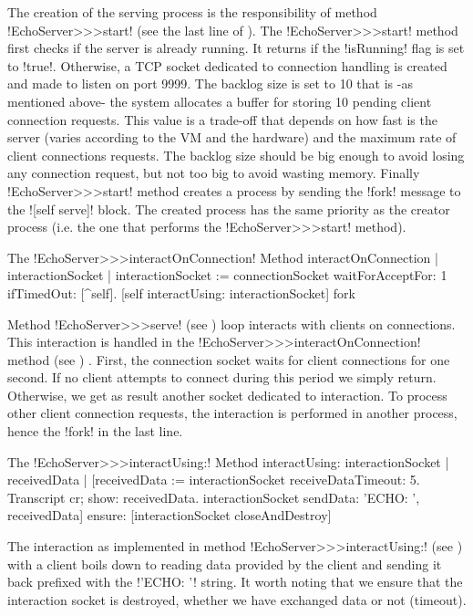 \documentclass[a4paper,10pt,twoside]{book}
\begin{document}
The creation of the serving process is the responsibility of method \ct!EchoServer>>>start! (see the last line of ).
The \ct!EchoServer>>>start! method first checks if the server is already running.
It returns if the \ct!isRunning! flag is set to \ct!true!.
Otherwise, a TCP socket dedicated to connection handling is created and made to listen on port 9999.
The backlog size is set to 10 that is -as mentioned above- the system allocates a buffer for storing 10 pending client connection requests.
This value is a trade-off that depends on how fast is the server (varies according to the VM and the hardware) and the maximum rate of client connections requests.
The backlog size should be big enough to avoid losing any connection request, but not too big to avoid wasting memory.
Finally \ct!EchoServer>>>start! method creates a process by sending the \ct!fork! message to the \ct![self serve]! block.
The created process has the same priority as the creator process (i.e. the one that performs the \ct!EchoServer>>>start! method).


\begin{method}{The \ct!EchoServer>>>interactOnConnection! Method}
interactOnConnection
	| interactionSocket |
	interactionSocket := connectionSocket waitForAcceptFor: 1 ifTimedOut: [^self].
	[self interactUsing: interactionSocket] fork
\end{method}

Method \ct!EchoServer>>>serve! (see ) loop interacts with clients on connections.
This interaction is handled in the \ct!EchoServer>>>interactOnConnection! method (see ) .
First, the connection socket waits for client connections for one second.
If no client attempts to connect during this period we simply return.
Otherwise, we get as result another socket dedicated to interaction.
To process other client connection requests, the interaction is performed in another process, hence the \ct!fork! in the last line.

\begin{method}{The \ct!EchoServer>>>interactUsing:! Method}
interactUsing: interactionSocket
	| receivedData |
	[receivedData := interactionSocket receiveDataTimeout: 5.
	 Transcript cr; show: receivedData.
	 interactionSocket sendData: 'ECHO: ', receivedData]
		ensure: [interactionSocket closeAndDestroy]
\end{method}
The interaction as implemented in method \ct!EchoServer>>>interactUsing:! (see ) with a client boils down to reading data provided by the client and sending it back prefixed with the \ct!'ECHO: '! string.
It worth noting that we ensure that the interaction socket is destroyed, whether we have exchanged data or not (timeout).
\end{document}
